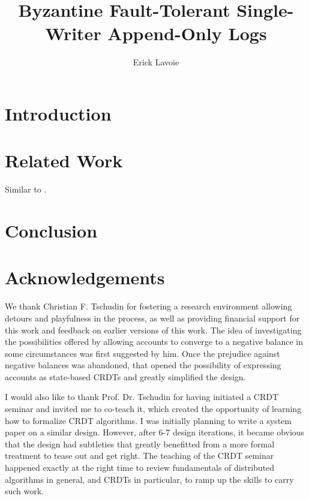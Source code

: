 \documentclass[9pt, oneside]{article}   	%
\title{Byzantine Fault-Tolerant Single-Writer Append-Only Logs}
\author{Erick Lavoie}
\begin{document}
\maketitle


\begin{abstract}

\end{abstract}

\section{Introduction}
\label{sec:introduction}

\section{Related Work}
\label{sec:rel-work}

Similar to \cite{bracha1987asyncByzantineAgreement}.



\section{Conclusion}
\label{sec:conclusion}


\section{Acknowledgements}
\label{sec:acknowledgements}

We thank Christian F. Tschudin for fostering a research environment allowing detours and playfulness in the process, as well as providing financial support for this work and feedback on earlier versions of this work. The idea of investigating the possibilities offered by allowing accounts to converge to a negative balance in some circumstances was first suggested by him. Once the prejudice against negative balances was abandoned, that opened the possibility of expressing accounts as state-based CRDTs and greatly simplified the design.

I would also like to thank Prof. Dr. Tschudin for having initiated a CRDT seminar and invited me to co-teach it, which created the opportunity of learning how to formalize CRDT algorithms. I was initially planning to write a system paper on a similar design. However, after 6-7 design iterations, it became obvious that the design had subtleties that greatly benefitted from a more formal treatment to tease out and get right. The teaching of the CRDT seminar happened exactly at the right time to review fundamentals of distributed algorithms in general, and CRDTs in particular, to ramp up the skills to carry such work.
\end{document}
